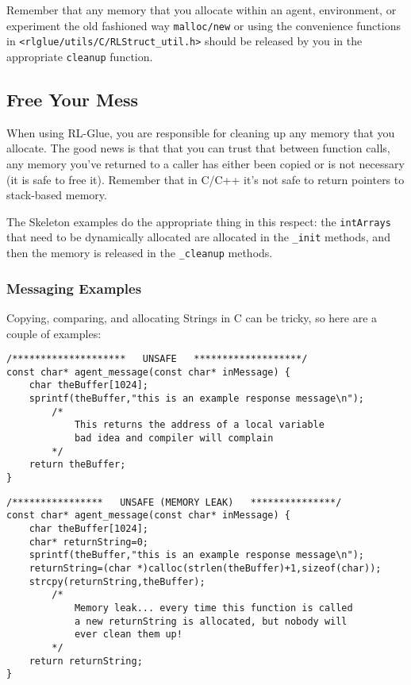 \documentclass[11pt]{article}
\begin{document}
Remember that any memory that you allocate within an agent, environment, or experiment the old fashioned way \texttt{malloc/new} or using the convenience functions in \texttt{<rlglue/utils/C/RLStruct\_util.h>} should be released
by you in the appropriate \texttt{cleanup} function.
\subsection{Free Your Mess}
When using RL-Glue, you are responsible for cleaning up any memory that you allocate. The good news is that that you can trust that between function calls, any memory you've returned to a caller has either been
copied or is not necessary (it is safe to free it).  Remember that in C/C++ it's not safe to return pointers to stack-based memory.

The Skeleton examples do the appropriate thing in this respect: the \texttt{intArrays} that need to be dynamically allocated are allocated in the \texttt{\_init} methods, and then the memory is released in the \texttt{\_cleanup} methods.

\subsubsection{Messaging Examples}
Copying, comparing, and allocating Strings in C can be tricky, so here are a couple of examples:

\begin{verbatim}
/********************   UNSAFE   *******************/
const char* agent_message(const char* inMessage) {
    char theBuffer[1024];
    sprintf(theBuffer,"this is an example response message\n");
        /*
            This returns the address of a local variable
            bad idea and compiler will complain
        */
    return theBuffer;
}
\end{verbatim}

\begin{verbatim}
/****************   UNSAFE (MEMORY LEAK)   ***************/
const char* agent_message(const char* inMessage) {
    char theBuffer[1024];
    char* returnString=0;
    sprintf(theBuffer,"this is an example response message\n");
    returnString=(char *)calloc(strlen(theBuffer)+1,sizeof(char));
    strcpy(returnString,theBuffer);
        /*
            Memory leak... every time this function is called
            a new returnString is allocated, but nobody will
            ever clean them up!
        */
    return returnString;
}
\end{verbatim}
\end{document}

